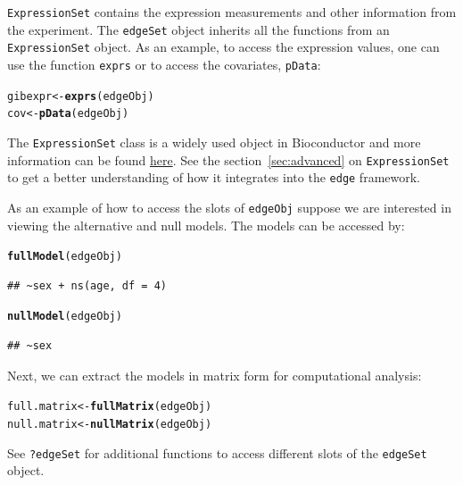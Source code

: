 \documentclass{article}\usepackage[]{graphicx}\usepackage[]{color}
\makeatletter
\newcommand{\hlstd}[1]{\textcolor[rgb]{0.345,0.345,0.345}{#1}}%
\newcommand{\hlkwb}[1]{\textcolor[rgb]{0.69,0.353,0.396}{#1}}%
\newcommand{\hlkwd}[1]{\textcolor[rgb]{0.737,0.353,0.396}{\textbf{#1}}}%
\newenvironment{kframe}{%
 \def\at@end@of@kframe{}%
 \ifinner\ifhmode%
  \def\at@end@of@kframe{\end{minipage}}%
  \begin{minipage}{\columnwidth}%
 \fi\fi%
 \def\FrameCommand##1{\hskip\@totalleftmargin \hskip-\fboxsep
 \colorbox{shadecolor}{##1}\hskip-\fboxsep
     \hskip-\linewidth \hskip-\@totalleftmargin \hskip\columnwidth}%
 \MakeFramed {\advance\hsize-\width
   \@totalleftmargin\z@ \linewidth\hsize
   \@setminipage}}%
 {\par\unskip\endMakeFramed%
 \at@end@of@kframe}
\newenvironment{knitrout}{}{} %
\makeatother
\begin{document}
{\tt ExpressionSet} contains the expression measurements and other information from the experiment. The {\tt edgeSet} object inherits all the functions from an {\tt ExpressionSet} object. As an example, to access the expression values, one can use the function {\tt exprs} or to access the covariates, {\tt pData}:
\begin{knitrout}
\color{fgcolor}\begin{kframe}
\begin{alltt}
\hlstd{gibexpr} \hlkwb{<-} \hlkwd{exprs}\hlstd{(edgeObj)}
\hlstd{cov} \hlkwb{<-} \hlkwd{pData}\hlstd{(edgeObj)}
\end{alltt}
\end{kframe}
\end{knitrout}
The {\tt ExpressionSet} class is a widely used object in Bioconductor and more information can be found \href{http://www.bioconductor.org/packages/2.14/bioc/html/Biobase.html}{here}. See the section~\ref{sec:advanced} on {\tt ExpressionSet} to get a better understanding of how it integrates into the {\tt edge} framework.

As an example of how to access the slots of {\tt edgeObj} suppose we are interested in viewing the alternative and null models. The models can be accessed by:
\begin{knitrout}
\color{fgcolor}\begin{kframe}
\begin{alltt}
\hlkwd{fullModel}\hlstd{(edgeObj)}
\end{alltt}
\begin{verbatim}
## ~sex + ns(age, df = 4)
\end{verbatim}
\begin{alltt}
\hlkwd{nullModel}\hlstd{(edgeObj)}
\end{alltt}
\begin{verbatim}
## ~sex
\end{verbatim}
\end{kframe}
\end{knitrout}
Next, we can extract the models in matrix form for computational analysis:
\begin{knitrout}
\color{fgcolor}\begin{kframe}
\begin{alltt}
\hlstd{full.matrix} \hlkwb{<-} \hlkwd{fullMatrix}\hlstd{(edgeObj)}
\hlstd{null.matrix} \hlkwb{<-} \hlkwd{nullMatrix}\hlstd{(edgeObj)}
\end{alltt}
\end{kframe}
\end{knitrout}
See {\tt ?edgeSet} for additional functions to access different slots of the {\tt edgeSet} object. 
\end{document}
